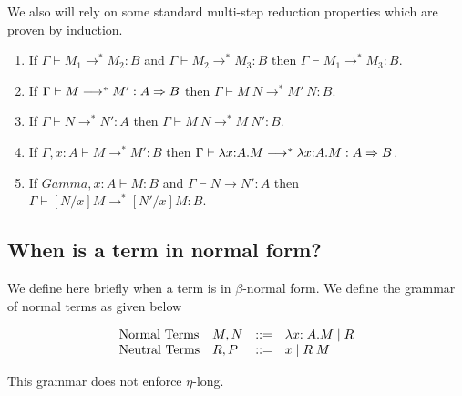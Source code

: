 \documentclass{article}
\newcommand{\nf}[2]{#1 : #2 ~\mathsf{nf}}
\newcommand{\neu}[2]{#1 : #2 ~\mathsf{ne}}
\newcommand{\mred}{\longrightarrow^*}
\newcommand{\red}{\longrightarrow}
\begin{document}
We also will rely on some standard multi-step reduction properties which are proven by induction.

\begin{lemma}\label{lm:mredprop}
\quad
\begin{enumerate}
\item\label{lm:mredtrans} If $\Gamma \vdash M_1 \mred M_2 : B$ and $\Gamma \vdash M_2 \mred M_3 : B$ then $\Gamma \vdash M_1 \mred M_3 : B$.
\item\label{lm:mredappl} If $\Gamma \vdash M \mred M' : A \arrow B$ then $\Gamma \vdash M~N \mred M'~N : B$.
\item\label{lm:mredappr} If $\Gamma \vdash N \mred N' : A$ then $\Gamma \vdash M~N \mred M~N' : B$.
\item\label{lm:mredabs} If $\Gamma,x{:}A \vdash M \mred M' : B$ then $\Gamma \vdash \lambda x{:}A.M \mred \lambda x{:}A.M : A \arrow B$.
\item\label{lm:mredsubs} If $Gamma, x{:}A \vdash M : B$ and $\Gamma \vdash N \red N' : A$
then $\Gamma \vdash [N/x]M \mred [N'/x]M : B$.
\end{enumerate}  
\end{lemma}


\subsection*{When is a term in normal form?}

We define here briefly when a term is in $\beta$-normal form.
We define the grammar of normal terms as given below

\[
\begin{array}{llcl}
\mbox{Normal Terms}  & M,N & \mathrel{::=} & \lambda x{:A}. M \mid R \\
\mbox{Neutral Terms} & R, P & \mathrel{::=} & x \mid R\;M \\
  \end{array}
\]

This grammar does not enforce $\eta$-long.

\end{document}
